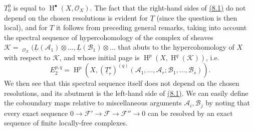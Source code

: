 \documentclass{article}
\theoremstyle{plain}
\theoremstyle{definition}
\newcommand{\scr}[1]{{\mathscr{#1}}}
\DeclareMathOperator{\shHom}{\underline{Hom}}
\DeclareMathOperator{\HH}{H}
\begin{document}
$T_0^0$ is equal to $\HH^\bullet(X,\scr{O}_X)$.
The fact that the right-hand sides of \hyperref[8.1]{(8.1)} do not depend on the chosen resolutions is evident for $\underline{T}$ (since the question is then local), and for $T$ it follows from preceding general remarks, taking into account the spectral sequence of hypercohomology of the complex of sheaves $\scr{K}=\shHom_{\scr{O}_X}(\underline{L}(\scr{A}_1)\otimes\ldots,\underline{L}(\scr{B}_1)\otimes\ldots$ that abuts to the hypercohomology of $X$ with respect to $\scr{K}$, and whose initial page is $\HH^p(X,\HH^q(\scr{K}))$, i.e.
\[
\label{8.2}
  E_2^{p,q} = \HH^p(X,(\underline{T}_r^s)^{(q)}(\scr{A}_1,\ldots,\scr{A}_r;\scr{B}_1,\ldots,\scr{B}_s)).
\tag{8.2}
\]
We then see that this spectral sequence itself does not depend on the chosen resolutions, and its abutment is the left-hand side of \hyperref[8.1]{(8.1)}.
We can easily define the coboundary maps relative to miscellaneous arguments $\scr{A}_i,\scr{B}_j$ by noting that every exact sequence $0\to\scr{F}'\to\scr{F}\to\scr{F}''\to0$ can be resolved by an exact sequence of finite locally-free complexes.
\end{document}
